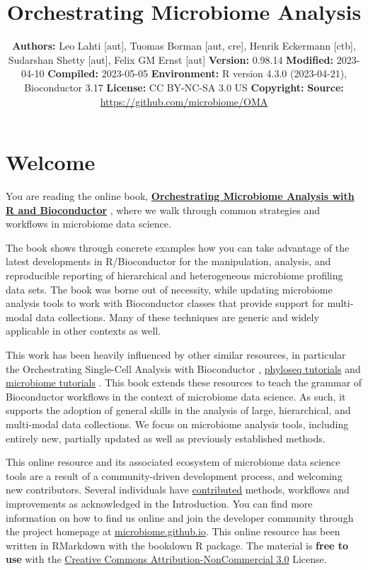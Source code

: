 \documentclass[
]{book}
\title{Orchestrating Microbiome Analysis}
\author{}
\date{\vspace{-2.5em}\textbf{Authors:} Leo Lahti {[}aut{]}, Tuomas Borman {[}aut, cre{]}, Henrik Eckermann {[}ctb{]}, Sudarshan Shetty {[}aut{]}, Felix GM Ernst {[}aut{]} \textbf{Version:} 0.98.14 \textbf{Modified:} 2023-04-10 \textbf{Compiled:} 2023-05-05 \textbf{Environment:} R version 4.3.0 (2023-04-21), Bioconductor 3.17 \textbf{License:} CC BY-NC-SA 3.0 US \textbf{Copyright:} \textbf{Source:} \url{https://github.com/microbiome/OMA}}
\begin{document}
\maketitle

{
\setcounter{tocdepth}{1}
\tableofcontents
}
\hypertarget{welcome}{%
\chapter*{Welcome}\label{welcome}}

You are reading the online book, \href{microbiome.github.io/OMA}{\textbf{Orchestrating Microbiome Analysis
with R and Bioconductor}} \citep{OMA}, where we
walk through common strategies and workflows in microbiome data
science.

The book shows through concrete examples how you can take advantage of
the latest developments in R/Bioconductor for the manipulation,
analysis, and reproducible reporting of hierarchical and heterogeneous
microbiome profiling data sets. The book was borne out of necessity,
while updating microbiome analysis tools to work with Bioconductor
classes that provide support for multi-modal data collections. Many of
these techniques are generic and widely applicable in other contexts
as well.

This work has been heavily influenced by other similar resources, in
particular the Orchestrating Single-Cell Analysis with Bioconductor
\citep{Amezquita2020}, \href{http://joey711.github.io/phyloseq/tutorials-index}{phyloseq
tutorials}
\citep{Callahan2016} and \href{https://microbiome.github.io/tutorials/}{microbiome
tutorials} \citep{Shetty2019}.
This book extends these resources to teach the grammar of Bioconductor
workflows in the context of microbiome data science. As such, it
supports the adoption of general skills in the analysis of large,
hierarchical, and multi-modal data collections. We focus on microbiome
analysis tools, including entirely new, partially updated as well as
previously established methods.

This online resource and its associated ecosystem of microbiome data
science tools are a result of a community-driven development process,
and welcoming new contributors. Several individuals have
\href{https://github.com/microbiome/OMA/graphs/contributors}{contributed}
methods, workflows and improvements as acknowledged in the
Introduction. You can find more information on how to find us online
and join the developer community through the project homepage at
\href{https://microbiome.github.io}{microbiome.github.io}. This online
resource has been written in RMarkdown with the bookdown R
package. The material is \textbf{free to use} with the \href{https://creativecommons.org/licenses/by-nc/3.0/us/}{Creative Commons
Attribution-NonCommercial
3.0} License.
\end{document}
